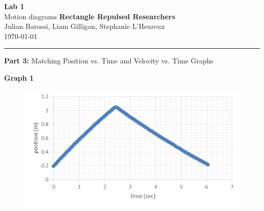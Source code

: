 \documentclass[12pt, letterpaper]{article}
\begin{document}
  \begin{titlepage} 
    \begin{center}
      \Huge{\textbf{Lab 1}}\\
      \Huge{Motion diagrams}
      \vfill
      \large{\textbf{Rectangle Repulsed Researchers}}\\
      \large{Julian Barossi, Liam Gilligan, Stephanie L'Heureux}\\
      \vspace*{0.5cm}
      \normalsize
      \today
    \end{center}
  \end{titlepage}

  \begin{center}
    \rule{\textwidth}{0.5pt}
    \normalsize{\textbf{Part 3:} Matching Position vs. Time and Velocity vs. Time Graphs}\\
    \vspace{0.5cm}
  \end{center}

  \begin{center}
    \Large\textbf{{Graph 1}}\\
  \end{center}

  \begin{figure}[H]
    \centering 
    \includegraphics[width=\linewidth]{graph_1.png}
    \label{fig:graph1}
  \end{figure}
\end{document}
